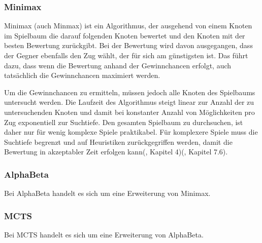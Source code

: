 
\subsubsection{Minimax}

Minimax (auch Minmax) ist ein Algorithmus, der ausgehend von einem Knoten im Spielbaum die darauf folgenden Knoten bewertet und den Knoten mit der besten Bewertung zurückgibt. Bei der Bewertung wird davon ausgegangen, dass der Gegner ebenfalls den Zug wählt, der für sich am günstigsten ist. Das führt dazu, dass wenn die Bewertung anhand der Gewinnchancen erfolgt, auch tatsächlich die Gewinnchancen maximiert werden.

Um die Gewinnchancen zu ermitteln, müssen jedoch alle Knoten des Spielbaums untersucht werden. Die Laufzeit des Algorithmus steigt linear zur Anzahl der zu untersuchenden Knoten und damit bei konstanter Anzahl von Möglichkeiten pro Zug exponentiell zur Suchtiefe. Den gesamten Spielbaum zu durchsuchen, ist daher nur für wenig komplexe Spiele praktikabel. Für komplexere Spiele muss die Suchtiefe begrenzt und auf Heuristiken zurückgegriffen werden, damit die Bewertung in akzeptabler Zeit erfolgen kann(\cite{Ferguson.January2019}, Kapitel 4)(\cite{Heineman.October2008}, Kapitel 7.6).

\subsubsection{AlphaBeta}

Bei AlphaBeta handelt es sich um eine Erweiterung von Minimax.

\subsubsection{MCTS}

Bei MCTS handelt es sich um eine Erweiterung von AlphaBeta.